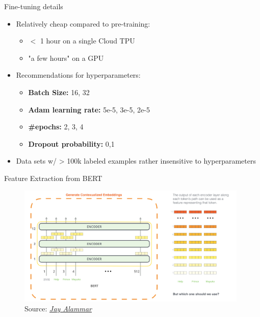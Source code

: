 
\begin{frame}{Fine-tuning details}

\vfill

\begin{itemize}
	\item Relatively cheap compared to pre-training:
		\begin{itemize}
			\item $<$ 1 hour on a single Cloud TPU
			\item "a few hours" on a GPU
		\end{itemize}
	\item Recommendations for hyperparameters:
		\begin{itemize}
			\item \textbf{Batch Size:} 16, 32
			\item \textbf{Adam learning rate:} 5e-5, 3e-5, 2e-5
			\item \textbf{\#epochs:} 2, 3, 4
			\item \textbf{Dropout probability:} 0,1
		\end{itemize}
	\item Data sets w/ > 100k labeled examples rather insensitive to hyperparameters
\end{itemize}
	
\vfill

\end{frame}


\begin{vbframe}{Feature Extraction from BERT}

\vfill

	\begin{figure}
		\centering
		\includegraphics[width = 11cm]{figure/bert-featextr.png}\\ 
		\footnotesize{Source:} \href{https://jalammar.github.io/illustrated-bert/}{\footnotesize \it Jay Alammar}
	\end{figure}

\vfill

\end{vbframe}

